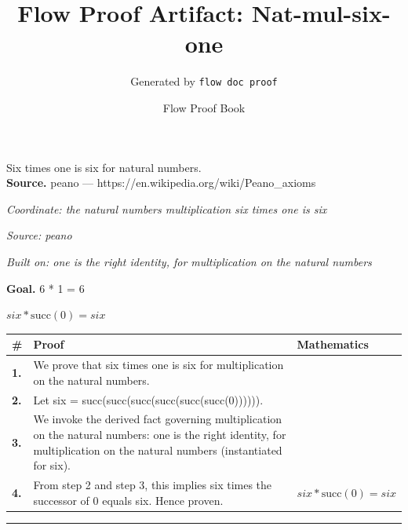 \documentclass[11pt]{article}
\title{Flow Proof Artifact: Nat-mul-six-one}
\author{Generated by \texttt{flow doc proof}}
\date{Flow Proof Book}
\theoremstyle{definition}
\begin{document}
\maketitle
Six times one is six for natural numbers.\\[0.5em]
\textbf{Source.} peano — https://en.wikipedia.org/wiki/Peano\_axioms\\[0.5em]
\bigskip
{}\par
\smallskip\noindent\textit{Coordinate: the natural numbers \cdot multiplication \cdot six times one is six}\par
\smallskip\noindent\textit{Source: peano}\par
\smallskip\noindent\textit{Built on: one is the right identity, for multiplication on the natural numbers}\par
\medskip
\noindent\textbf{Goal.} 6 * 1 = 6\par
\noindent$\displaystyle six * \mathrm{succ}(0) = six$\par
\medskip
\noindent
\begin{tabular}{@{} >{\raggedright\arraybackslash}p{} >{\raggedright\arraybackslash}p{} >{\raggedleft\arraybackslash}p{} @{}}
\textbf{\#} & \textbf{Proof} & \textbf{Mathematics} \\
\midrule
\textbf{1.} & We prove that six times one is six for multiplication on the natural numbers. & \\[0.45em]
\textbf{2.} & Let six = succ(succ(succ(succ(succ(succ(0)))))). & \\[0.45em]
\textbf{3.} & We invoke the derived fact governing multiplication on the natural numbers: one is the right identity, for multiplication on the natural numbers (instantiated for six). & \\[0.45em]
\textbf{4.} & From step 2 and step 3, this implies six times the successor of 0 equals six. Hence proven. & $\displaystyle six * \mathrm{succ}(0) = six$ \\[0.45em]
\bottomrule
\end{tabular}
\label{thm:Nat-multiplication-six_times_one_is_six}
\par\medskip\hrule
\end{document}

